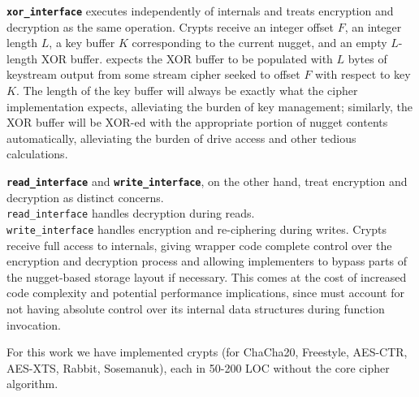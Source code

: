 
{\bf \texttt{xor\_interface}} executes independently of \sys internals and
treats encryption and decryption as the same operation. Crypts receive an
integer offset $F$, an integer length $L$, a key buffer $K$ corresponding to the
current nugget, and an empty $L$-length XOR buffer. \sys expects the XOR buffer
to be populated with $L$ bytes of keystream output from some stream cipher
seeked to offset $F$ with respect to key $K$. The length of the key buffer will
always be exactly what the cipher implementation expects, alleviating the burden
of key management; similarly, the XOR buffer will be XOR-ed with the appropriate
portion of nugget contents automatically, alleviating the burden of drive access
and other tedious calculations.


{\bf \texttt{read\_interface}} and {\bf \texttt{write\_interface}}, on the other
hand, treat encryption and decryption as distinct concerns.
\\\texttt{read\_interface} handles decryption during reads.
\\\texttt{write\_interface} handles encryption and re-ciphering during writes.
Crypts receive full access to \sys internals, giving wrapper code complete
control over the encryption and decryption process and allowing implementers to
bypass parts of the nugget-based storage layout if necessary. This comes at the
cost of increased code complexity and potential performance implications, since
\sys must account for not having absolute control over its internal data
structures during function invocation.

For this work we have implemented \numConfigs crypts (\eg for ChaCha20,
Freestyle, AES-CTR, AES-XTS, Rabbit, Sosemanuk), each in 50-200 LOC without the
core cipher algorithm.
